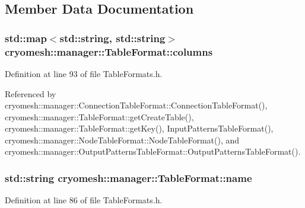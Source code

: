 \subsection{\-Member \-Data \-Documentation}
\hypertarget{structcryomesh_1_1manager_1_1TableFormat_a29ab6f4cfc0c56da1fa461ea665a1b61}{
\subsubsection[{columns}]{\setlength{\rightskip}{0pt plus 5cm}std\-::map$<$std\-::string, std\-::string$>$ {\bf cryomesh\-::manager\-::\-Table\-Format\-::columns}}}\label{structcryomesh_1_1manager_1_1TableFormat_a29ab6f4cfc0c56da1fa461ea665a1b61}


\-Definition at line 93 of file \-Table\-Formats.\-h.



\-Referenced by cryomesh\-::manager\-::\-Connection\-Table\-Format\-::\-Connection\-Table\-Format(), cryomesh\-::manager\-::\-Table\-Format\-::get\-Create\-Table(), cryomesh\-::manager\-::\-Table\-Format\-::get\-Key(), \-Input\-Patterns\-Table\-Format(), cryomesh\-::manager\-::\-Node\-Table\-Format\-::\-Node\-Table\-Format(), and cryomesh\-::manager\-::\-Output\-Patterns\-Table\-Format\-::\-Output\-Patterns\-Table\-Format().

\hypertarget{structcryomesh_1_1manager_1_1TableFormat_ab49912897ccb7fd0f8d42f1cc21332e8}{
\subsubsection[{name}]{\setlength{\rightskip}{0pt plus 5cm}std\-::string {\bf cryomesh\-::manager\-::\-Table\-Format\-::name}}}\label{structcryomesh_1_1manager_1_1TableFormat_ab49912897ccb7fd0f8d42f1cc21332e8}


\-Definition at line 86 of file \-Table\-Formats.\-h.



